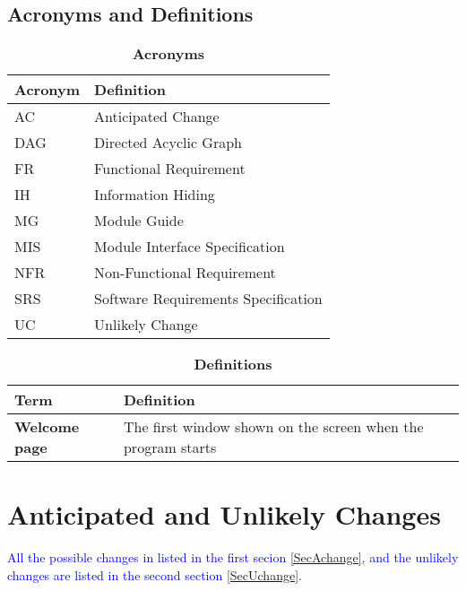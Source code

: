 \documentclass[12pt,letterpaper]{article}
\begin{document}
	\subsection{Acronyms and Definitions}
        \begin{table}[H]
            \centering
            \caption{\bf Acronyms}
            \label{TableAcronym}
            \bigskip
            \def\arraystretch{1.5}
            \begin{tabularx}{\textwidth}{p{3.7cm}X}
                \toprule
                \textbf{Acronym} & \textbf{Definition} \\
                \midrule
                AC & Anticipated Change\\
                DAG & Directed Acyclic Graph\\
                FR & Functional Requirement\\
                IH & Information Hiding\\
                MG & Module Guide\\
                MIS & Module Interface Specification\\
                NFR & Non-Functional Requirement\\
                SRS & Software Requirements Specification\\
                UC & Unlikely Change\\
            \bottomrule
            \end{tabularx}
        \end{table}
\begin{table}[H]
            \centering
            \caption{\bf Definitions}
            \label{TableDefinitions}
            \bigskip
            \def\arraystretch{1.5}
            \begin{tabularx}{\textwidth}{p{3.7cm}X}
                \toprule
                \textbf{Term} & \textbf{Definition}\\
                \midrule
                \textbf{Welcome page} & The first window shown on the screen when the program starts\\
                \bottomrule
            \end{tabularx}
        \end{table}
	
	\section{Anticipated and Unlikely Changes} \label{SecChange}
	\textcolor{blue}{All the possible changes in listed in the first secion \ref{SecAchange}, and the unlikely changes are listed in the second section \ref{SecUchange}.}	
\end{document}
